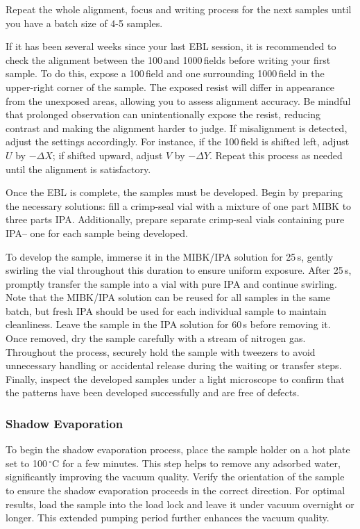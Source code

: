         Repeat the whole alignment, focus and writing process for the next samples until you have a batch size of 4-5 samples.

        If it has been several weeks since your last EBL session, it is recommended to check the alignment between the 100\,\mum and 1000\,\mum fields before writing your first sample. To do this, expose a 100\,\mum field and one surrounding 1000\,\mum field in the upper-right corner of the sample. The exposed resist will differ in appearance from the unexposed areas, allowing you to assess alignment accuracy. Be mindful that prolonged observation can unintentionally expose the resist, reducing contrast and making the alignment harder to judge. If misalignment is detected, adjust the settings accordingly. For instance, if the 100\,\mum field is shifted left, adjust $U$ by $-\Delta X$; if shifted upward, adjust $V$ by $-\Delta Y$. Repeat this process as needed until the alignment is satisfactory.

        Once the EBL is complete, the samples must be developed. Begin by preparing the necessary solutions: fill a crimp-seal vial with a mixture of one part MIBK to three parts IPA. Additionally, prepare separate crimp-seal vials containing pure IPA-- one for each sample being developed.

        To develop the sample, immerse it in the MIBK/IPA solution for 25\,s, gently swirling the vial throughout this duration to ensure uniform exposure. After 25\,s, promptly transfer the sample into a vial with pure IPA and continue swirling. Note that the MIBK/IPA solution can be reused for all samples in the same batch, but fresh IPA should be used for each individual sample to maintain cleanliness. Leave the sample in the IPA solution for 60\,s before removing it. Once removed, dry the sample carefully with a stream of nitrogen gas. Throughout the process, securely hold the sample with tweezers to avoid unnecessary handling or accidental release during the waiting or transfer steps. Finally, inspect the developed samples under a light microscope to confirm that the patterns have been developed successfully and are free of defects.

    \subsubsection*{Shadow Evaporation}
        To begin the shadow evaporation process, place the sample holder on a hot plate set to 100\,$^\circ$C for a few minutes. This step helps to remove any adsorbed water, significantly improving the vacuum quality. Verify the orientation of the sample to ensure the shadow evaporation proceeds in the correct direction. For optimal results, load the sample into the load lock and leave it under vacuum overnight or longer. This extended pumping period further enhances the vacuum quality.


